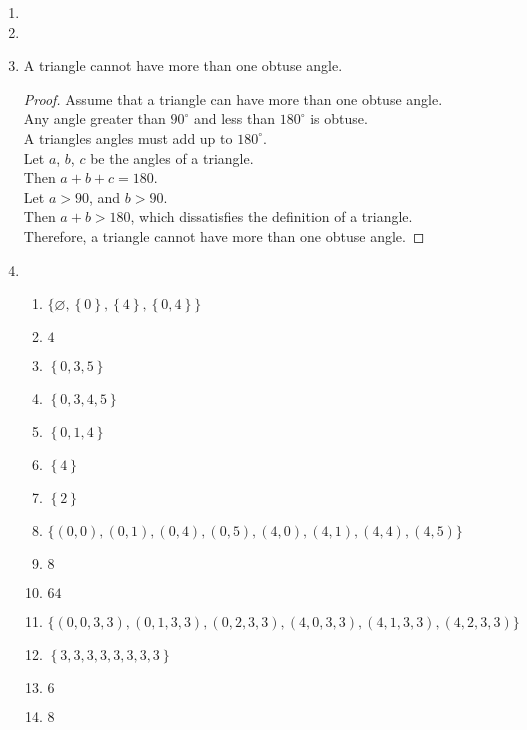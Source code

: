 \begin{enumerate}[leftmargin=2cm,labelsep=.5cm,label=\bf\arabic*.]
\item


\item

\item
\begin{lemma}[t]
A triangle cannot have more than one obtuse angle.
\end{lemma}
\begin{proof}
Assume that a triangle can have more than one obtuse angle.\\
Any angle greater than $90^{\circ}$ and less than $180^{\circ}$ is obtuse.\\
A triangles angles must add up to $180^{\circ}$.\\[2mm]
Let $a$, $b$, $c$ be the angles of a triangle.\\
Then $a + b + c = 180$.\\
Let $a > 90$, and $b > 90$.\\[2mm]
Then $a + b > 180$, which dissatisfies the definition of a triangle.\\
Therefore, a triangle cannot have more than one obtuse angle.
\end{proof}

\item
\begin{enumerate}
  \item $\big\{\varnothing,\left\{0\right\},\left\{4\right\},\left\{0,4\right\} \big\}$
  \item $4$
  \item $\left\{0,3,5 \right\}$
  \item $\left\{0,3,4,5 \right\}$
  \item $\left\{0,1,4 \right\}$
  \item $\left\{4 \right\}$
  \item $\left\{2 \right\}$
  \item $\big\{\left(0,0\right),\left(0,1\right),\left(0,4\right),\left(0,5\right),\left(4,0\right),\left(4,1\right),\left(4,4\right),\left(4,5\right) \big\}$
  \item $8$
  \item $64$
  \item $\big\{\left(0,0,3,3\right),\left(0,1,3,3\right),\left(0,2,3,3\right),\left(4,0,3,3\right),\left(4,1,3,3\right),\left(4,2,3,3\right) \big\}$
  \item $\left\{3,3,3,3,3,3,3,3 \right\}$
  \item $6$
  \item $8$\\[5mm]
\end{enumerate}


\end{enumerate}
